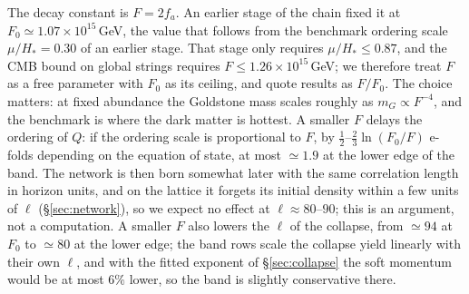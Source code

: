 \documentclass[11pt,a4paper]{article}
\begin{document}
The decay constant is $F=2f_a$.
An earlier stage of the chain fixed it at $F_0\simeq1.07\times10^{15}$\,GeV, the value that follows from the benchmark ordering scale $\mu/H_*=0.30$ of an earlier stage.
That stage only requires $\mu/H_*\le0.87$, and the CMB bound on global strings requires $F\le1.26\times10^{15}$\,GeV; we therefore treat $F$ as a free parameter with $F_0$ as its ceiling, and quote results as $F/F_0$.
The choice matters: at fixed abundance the Goldstone mass scales roughly as $m_G\propto F^{-4}$, and the benchmark is where the dark matter is hottest.
A smaller $F$ delays the ordering of $Q$: if the ordering scale is proportional to $F$, by $\tfrac12$--$\tfrac23\ln(F_0/F)$ e-folds depending on the equation of state, at most $\simeq1.9$ at the lower edge of the band. The network is then born somewhat later with the same correlation length in horizon units, and on the lattice it forgets its initial density within a few units of $\ell$ (\S\ref{sec:network}), so we expect no effect at $\ell\approx80$--$90$; this is an argument, not a computation. A smaller $F$ also lowers the $\ell$ of the collapse, from $\simeq94$ at $F_0$ to $\simeq80$ at the lower edge; the band rows scale the collapse yield linearly with their own $\ell$, and with the fitted exponent of \S\ref{sec:collapse} the soft momentum would be at most $6\%$ lower, so the band is slightly conservative there.
\end{document}
